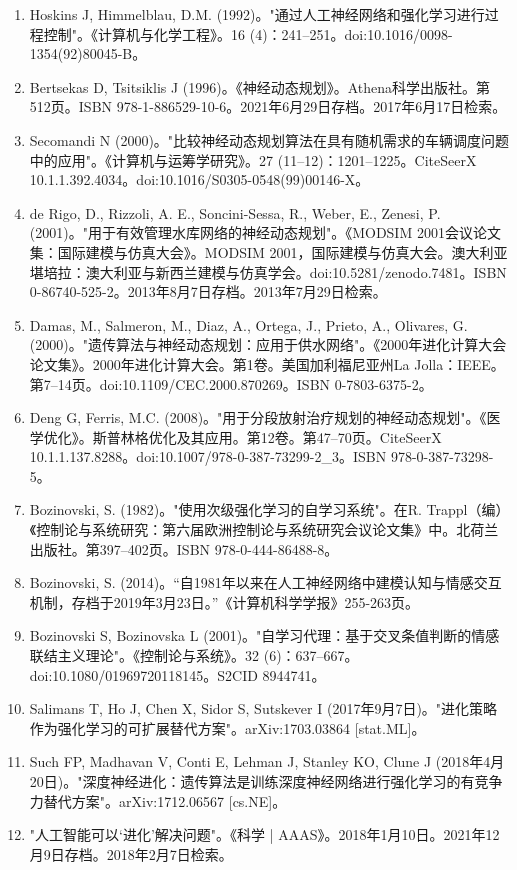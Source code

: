 \begin{enumerate}
\item Hoskins J, Himmelblau, D.M. (1992)。"通过人工神经网络和强化学习进行过程控制"。《计算机与化学工程》。16 (4)：241–251。doi:10.1016/0098-1354(92)80045-B。
\item Bertsekas D, Tsitsiklis J (1996)。《神经动态规划》。Athena科学出版社。第512页。ISBN 978-1-886529-10-6。2021年6月29日存档。2017年6月17日检索。
\item Secomandi N (2000)。"比较神经动态规划算法在具有随机需求的车辆调度问题中的应用"。《计算机与运筹学研究》。27 (11–12)：1201–1225。CiteSeerX 10.1.1.392.4034。doi:10.1016/S0305-0548(99)00146-X。
\item de Rigo, D., Rizzoli, A. E., Soncini-Sessa, R., Weber, E., Zenesi, P. (2001)。"用于有效管理水库网络的神经动态规划"。《MODSIM 2001会议论文集：国际建模与仿真大会》。MODSIM 2001，国际建模与仿真大会。澳大利亚堪培拉：澳大利亚与新西兰建模与仿真学会。doi:10.5281/zenodo.7481。ISBN 0-86740-525-2。2013年8月7日存档。2013年7月29日检索。
\item Damas, M., Salmeron, M., Diaz, A., Ortega, J., Prieto, A., Olivares, G. (2000)。"遗传算法与神经动态规划：应用于供水网络"。《2000年进化计算大会论文集》。2000年进化计算大会。第1卷。美国加利福尼亚州La Jolla：IEEE。第7–14页。doi:10.1109/CEC.2000.870269。ISBN 0-7803-6375-2。
\item Deng G, Ferris, M.C. (2008)。"用于分段放射治疗规划的神经动态规划"。《医学优化》。斯普林格优化及其应用。第12卷。第47–70页。CiteSeerX 10.1.1.137.8288。doi:10.1007/978-0-387-73299-2_3。ISBN 978-0-387-73298-5。
\item Bozinovski, S. (1982)。"使用次级强化学习的自学习系统"。在R. Trappl（编）《控制论与系统研究：第六届欧洲控制论与系统研究会议论文集》中。北荷兰出版社。第397–402页。ISBN 978-0-444-86488-8。
\item Bozinovski, S. (2014)。“自1981年以来在人工神经网络中建模认知与情感交互机制，存档于2019年3月23日。”《计算机科学学报》255-263页。
\item Bozinovski S, Bozinovska L (2001)。"自学习代理：基于交叉条值判断的情感联结主义理论"。《控制论与系统》。32 (6)：637–667。doi:10.1080/01969720118145。S2CID 8944741。
\item Salimans T, Ho J, Chen X, Sidor S, Sutskever I (2017年9月7日)。"进化策略作为强化学习的可扩展替代方案"。arXiv:1703.03864 [stat.ML]。
\item Such FP, Madhavan V, Conti E, Lehman J, Stanley KO, Clune J (2018年4月20日)。"深度神经进化：遗传算法是训练深度神经网络进行强化学习的有竞争力替代方案"。arXiv:1712.06567 [cs.NE]。
\item "人工智能可以‘进化’解决问题"。《科学 | AAAS》。2018年1月10日。2021年12月9日存档。2018年2月7日检索。

\end{enumerate}
